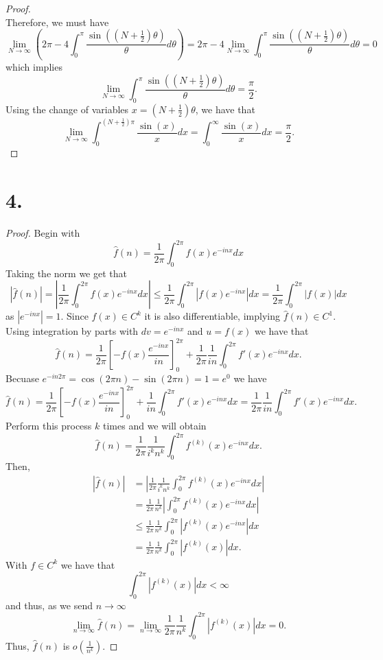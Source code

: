 \documentclass{article}
\begin{document}
\begin{proof}
\[    \]
    Therefore, we must have 
    \[
        \lim\limits_{N \to \infty}\left(2 \pi   - 4 \int_{0}^{\pi} \frac{\sin\left(\left(N + \frac{1}{2} \right)\theta\right)} {\theta} d \theta \right)  = 2 \pi -4\lim\limits_{N \to \infty}\int_{0}^{\pi} \frac{\sin\left(\left(N + \frac{1}{2} \right)\theta\right)} {\theta} d \theta = 0
    \]
    which implies \[
        \lim\limits_{N \to \infty}\int_{0}^{\pi} \frac{\sin\left(\left(N + \frac{1}{2} \right)\theta\right)} {\theta} d \theta = \frac{\pi}{2}.
    \]
    Using the change of variables $x = \left(N + \frac{1}{2}\right)\theta$, we have that \[
    \lim\limits_{N \to \infty}\int_0^{\left(N + \frac{1}{2}\right)\pi}  \frac{\sin(x)}{x} dx  = \int_0^{\infty} \frac{\sin(x)}{x} dx = \frac{\pi}{2}. 
    \]



\end{proof}
\section*{4.}
\begin{proof}
    Begin with 
    \[
    \hat{f}(n) = \frac{1}{2 \pi}\int_0^{2 \pi}f(x)e^{-inx}dx    
    \]
    Taking the norm we get that \[
    |\hat{f}(n)| = \left|\frac{1}{2 \pi}\int_0^{2 \pi}f(x)e^{-inx}dx \right| \leq \frac{1}{2 \pi}\int_0^{2 \pi}\left|f(x)e^{-inx}\right|dx = \frac{1}{2 \pi}\int_0^{2 \pi}|f(x)|dx
    \]
    as $\left|e^{-inx}\right| = 1$. Since $f(x) \in C^k$ it is also differentiable, implying $\hat{f}(n) \in C^1$. Using integration by parts with $dv = e^{-inx}$ and $u = f(x)$ we have that 
    \[
    \hat{f}(n) = \frac{1}{2 \pi}\left[-f(x)\frac{e^{-inx}}{in} \right]_0^{2 \pi } + \frac{1}{2 \pi}\frac{1}{in} \int_0^{2 \pi} f'(x)e^{-inx} dx.    
    \]
    Becuase $e^{-in2 \pi } = \cos(2\pi n) - \sin(2 \pi n) = 1 = e^{0}$ we have
    \[
        \hat{f}(n) = \frac{1}{2 \pi}\left[-f(x)\frac{e^{-inx}}{in} \right]_0^{2 \pi } + \frac{1}{in} \int_0^{2 \pi} f'(x)e^{-inx} dx = \frac{1}{2 \pi}\frac{1}{in} \int_0^{2 \pi} f'(x)e^{-inx} dx.
    \]
    Perform this process $k$ times and we will obtain \[
    \hat{f}(n) =  \frac{1}{2 \pi}\frac{1}{i^kn^k} \int_0^{2 \pi}f^{(k)}(x)e^{-inx} dx.    
    \]
    Then, 
    \begin{align*}
    |\hat{f}(n)| &= \left| \frac{1}{2 \pi}\frac{1}{i^kn^k} \int_0^{2 \pi}f^{(k)}(x)e^{-inx} dx \right|\\ &=  \frac{1}{2 \pi}\frac{1}{n^k} \left|\int_0^{2 \pi}f^{(k)}(x)e^{-inx} dx  \right|\\ &\leq  \frac{1}{2 \pi}\frac{1}{n^k} \int_0^{2 \pi}\left|f^{(k)}(x)e^{-inx}\right| dx \\ &= \frac{1}{2 \pi}\frac{1}{n^k} \int_0^{2 \pi}\left|f^{(k)}(x)\right|dx. 
    \end{align*}
    With $f \in C^{k}$ we have that 
    \[
        \int_0^{2 \pi}\left|f^{(k)}(x)\right|dx < \infty
    \]
    and thus, as we send $n \to \infty$
    \[
    \lim\limits_{n \to \infty}\hat{f}(n) = \lim\limits_{n \to \infty} \frac{1}{2 \pi}\frac{1}{n^k} \int_0^{2 \pi}\left|f^{(k)}(x)\right|dx = 0.
    \]
    Thus, $\hat{f}(n)$ is $o\left(\frac{1}{n^k} \right)$. 
\end{proof}
\end{document}
